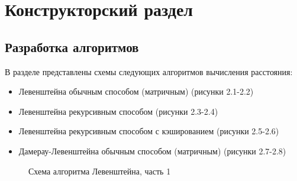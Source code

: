 \chapter{Конструкторский раздел}
\section{Разработка алгоритмов}
В разделе представлены схемы следующих алгоритмов вычисления расстояния:
\begin{itemize}
	\item Левенштейна обычным способом (матричным) (рисунки 2.1-2.2)
	\item Левенштейна рекурсивным способом (рисунки 2.3-2.4)
	\item Левенштейна рекурсивным способом с кэшированием (рисунки 2.5-2.6)
	\item Дамерау-Левенштейна обычным способом (матричным) (рисунки 2.7-2.8)
\end{itemize}

\begin{figure}
	\caption{Схема алгоритма Левенштейна, часть 1}
\end{figure}

